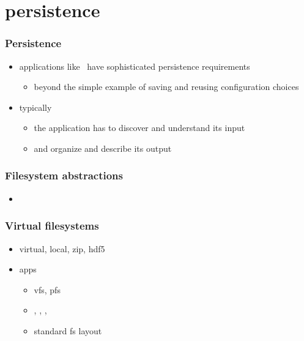 %
%

\section{persistence}

\begin{frame}
%
  \frametitle{Persistence}
%
  \begin{itemize}
%
  \item applications like \isce\ have sophisticated persistence requirements
    \begin{itemize}
    \item beyond the simple example of saving and reusing configuration choices
    \end{itemize}
%
  \item typically
    \begin{itemize}
    \item the application has to discover and understand its input
    \item and organize and describe its output
    \end{itemize}
%

%
  \end{itemize}
%
\end{frame}

\begin{frame}
%
  \frametitle{Filesystem abstractions}
%
  \begin{itemize}
%
  \item
%
  \end{itemize}
%
\end{frame}

\begin{frame}
%
  \frametitle{Virtual filesystems}
%
  \begin{itemize}
%
  \item virtual, local, zip, hdf5
%
  \item apps
    \begin{itemize}
    \item vfs, pfs
    \item {}, , ,
    \item standard fs layout
    \end{itemize}
%
  \end{itemize}
%
\end{frame}

